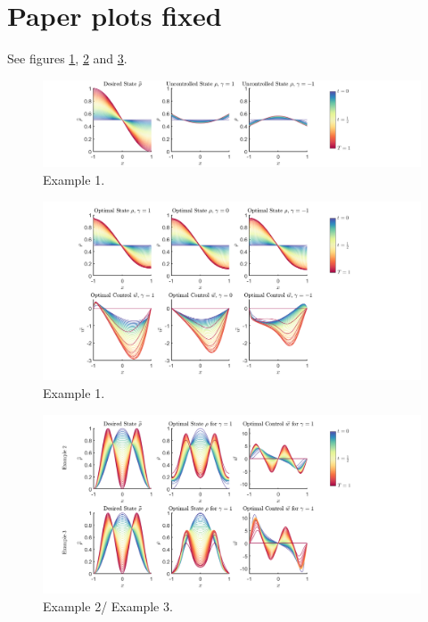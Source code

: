 \documentclass[11pt, a4paper]{article}
\theoremstyle{definition}
\begin{document}
\section{Paper plots fixed}
See figures \ref{PPPL1}, \ref{PPPL2} and \ref{PPPL3}.
\begin{figure}[h]
	\includegraphics[scale=0.3]{PPPL1.png}
	\caption{Example 1.}
	\label{PPPL1}
\end{figure}
\begin{figure}[h]
	\includegraphics[scale=0.3]{PPPL2.png}
	\caption{Example 1.}
	\label{PPPL2}
\end{figure}
\begin{figure}[h]
	\includegraphics[scale=0.3]{PPPL3.png}
	\caption{Example 2/ Example 3.}
	\label{PPPL3}
\end{figure}
\end{document}
